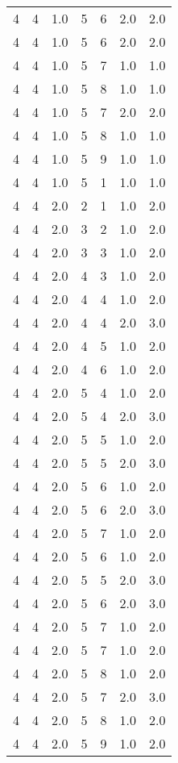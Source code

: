 \documentclass[a4paper,12pt]{article}
\begin{document}
\begin{center}
\begin{longtable}{ c c c | c c c | c }
        4 & 4 & 1.0 & 5 & 6 & 2.0 & 2.0 \\
        4 & 4 & 1.0 & 5 & 6 & 2.0 & 2.0 \\
        4 & 4 & 1.0 & 5 & 7 & 1.0 & 1.0 \\
        4 & 4 & 1.0 & 5 & 8 & 1.0 & 1.0 \\
        4 & 4 & 1.0 & 5 & 7 & 2.0 & 2.0 \\
        4 & 4 & 1.0 & 5 & 8 & 1.0 & 1.0 \\
        4 & 4 & 1.0 & 5 & 9 & 1.0 & 1.0 \\
        4 & 4 & 1.0 & 5 & 1 & 1.0 & 1.0 \\
        4 & 4 & 2.0 & 2 & 1 & 1.0 & 2.0 \\
        4 & 4 & 2.0 & 3 & 2 & 1.0 & 2.0 \\
        4 & 4 & 2.0 & 3 & 3 & 1.0 & 2.0 \\
        4 & 4 & 2.0 & 4 & 3 & 1.0 & 2.0 \\
        4 & 4 & 2.0 & 4 & 4 & 1.0 & 2.0 \\
        4 & 4 & 2.0 & 4 & 4 & 2.0 & 3.0 \\
        4 & 4 & 2.0 & 4 & 5 & 1.0 & 2.0 \\
        4 & 4 & 2.0 & 4 & 6 & 1.0 & 2.0 \\
        4 & 4 & 2.0 & 5 & 4 & 1.0 & 2.0 \\
        4 & 4 & 2.0 & 5 & 4 & 2.0 & 3.0 \\
        4 & 4 & 2.0 & 5 & 5 & 1.0 & 2.0 \\
        4 & 4 & 2.0 & 5 & 5 & 2.0 & 3.0 \\
        4 & 4 & 2.0 & 5 & 6 & 1.0 & 2.0 \\
        4 & 4 & 2.0 & 5 & 6 & 2.0 & 3.0 \\
        4 & 4 & 2.0 & 5 & 7 & 1.0 & 2.0 \\
        4 & 4 & 2.0 & 5 & 6 & 1.0 & 2.0 \\
        4 & 4 & 2.0 & 5 & 5 & 2.0 & 3.0 \\
        4 & 4 & 2.0 & 5 & 6 & 2.0 & 3.0 \\
        4 & 4 & 2.0 & 5 & 7 & 1.0 & 2.0 \\
        4 & 4 & 2.0 & 5 & 7 & 1.0 & 2.0 \\
        4 & 4 & 2.0 & 5 & 8 & 1.0 & 2.0 \\
        4 & 4 & 2.0 & 5 & 7 & 2.0 & 3.0 \\
        4 & 4 & 2.0 & 5 & 8 & 1.0 & 2.0 \\
        4 & 4 & 2.0 & 5 & 9 & 1.0 & 2.0 \\

\end{longtable}
\end{center}
\end{document}
